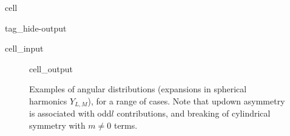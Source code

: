 \documentclass[letterpaper,table,10pt,english]{jupyterBook}
\begin{document}
\begin{sphinxuseclass}{cell}
\begin{sphinxuseclass}{tag_hide-output}
\begin{sphinxVerbatimInput}
\begin{sphinxuseclass}{cell_input}
\begin{sphinxVerbatim}[commandchars=\\\{\}]

 \PYG{p}{[}\PYG{p}{]}   
\end{sphinxVerbatim}

\end{sphinxuseclass}\end{sphinxVerbatimInput}

\end{sphinxuseclass}
\end{sphinxuseclass}
\begin{figure}[htbp]
\centering
\capstart
\begin{sphinxVerbatimOutput}

\begin{sphinxuseclass}{cell_output}
\noindent{}

\end{sphinxuseclass}\end{sphinxVerbatimOutput}
\caption{Examples of angular distributions (expansions in spherical harmonics \(Y_{L,M}\)), for a range of cases. Note that up\sphinxhyphen{}down asymmetry is associated with odd\sphinxhyphen{}\(l\) contributions, and breaking of cylindrical symmetry with \(m\neq0\) terms.}\label{\detokenize{part1/theory_observables_intro_211122:fig-pads-example}}\end{figure}
\end{document}
